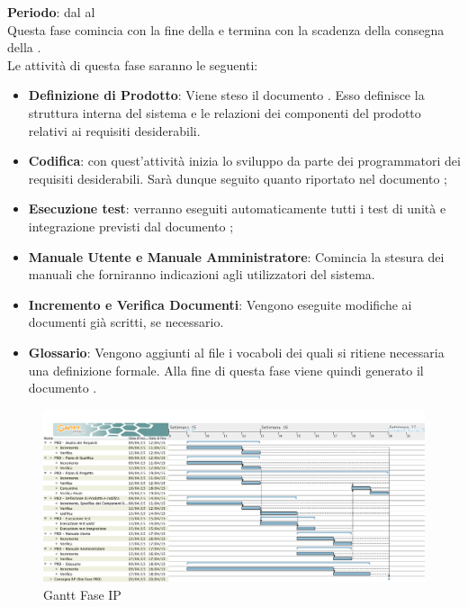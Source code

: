 	\textbf{Periodo}: dal  al  \\Questa fase comincia con la fine della  e termina con la scadenza della consegna della .\\Le attività di questa fase saranno le seguenti:
	\begin{itemize}
		\item\textbf{Definizione di Prodotto}: Viene steso il documento . Esso definisce la struttura interna del sistema e le relazioni dei componenti del prodotto relativi ai requisiti desiderabili.
		\item \textbf{Codifica}: con quest'attività inizia lo sviluppo da parte dei programmatori dei requisiti desiderabili. Sarà dunque seguito quanto riportato nel documento ;
		\item \textbf{Esecuzione test}: verranno eseguiti automaticamente tutti i test di unità e integrazione previsti dal documento ;
		\item\textbf{Manuale Utente e Manuale Amministratore}: Comincia la stesura dei manuali che forniranno indicazioni agli utilizzatori del sistema.
		\item\textbf{Incremento e Verifica Documenti}: Vengono eseguite modifiche ai documenti già scritti, se necessario.
		\item\textbf{Glossario}: Vengono aggiunti al file  i vocaboli dei quali si ritiene necessaria una definizione formale. Alla fine di questa fase viene quindi generato il documento .
	\end{itemize}
	\begin{figure}[H]\centering
		\includegraphics[width=\textwidth]{PianoDiProgetto/Pics/FaseIP.png}
	\caption{Gantt Fase IP}
\end{figure}
